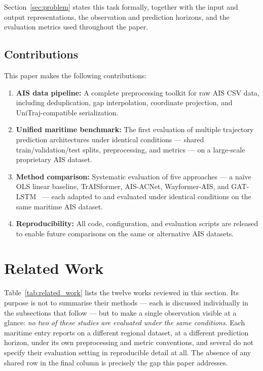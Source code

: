 \documentclass[12pt, a4paper]{article}
\begin{document}
  Section~\ref{sec:problem} states this task formally, together with the input
  and output representations, the observation and prediction horizons, and the
  evaluation metrics used throughout the paper.

  \subsection{Contributions}
  This paper makes the following contributions:
  \begin{enumerate}
      \item \textbf{AIS data pipeline:} A complete preprocessing toolkit for raw AIS CSV data,
      including deduplication, gap interpolation, coordinate projection, and
      UniTraj-compatible serialization.

      \item \textbf{Unified maritime benchmark:} The first evaluation of multiple trajectory
      prediction architectures under identical conditions — shared train/validation/test splits,
      preprocessing, and metrics — on a large-scale proprietary AIS dataset.

      \item \textbf{Method comparison:} Systematic evaluation of five approaches ---
      a na\"{i}ve OLS linear baseline, TrAISformer, AIS-ACNet,
      Wayformer-AIS, and GAT-LSTM~\citep{zhao2023gatlstm} --- each adapted to
      and evaluated under identical conditions on the same maritime AIS dataset.

      \item \textbf{Reproducibility:} All code, configuration, and evaluation scripts
      are released to enable future comparisons on the same or alternative AIS datasets.
  \end{enumerate}

  \section{Related Work}
  \label{sec:related}

  Table~\ref{tab:related_work} lists the twelve works reviewed in this section.
  Its purpose is not to summarise their methods — each is discussed individually
  in the subsections that follow — but to make a single observation visible at a
  glance: \emph{no two of these studies are evaluated under the same conditions}.
  Each maritime entry reports on a different regional dataset, at a different
  prediction horizon, under its own preprocessing and metric conventions, and
  several do not specify their evaluation setting in reproducible detail at all.
  The absence of any shared row in the final column is precisely the gap this
  paper addresses.
\end{document}
